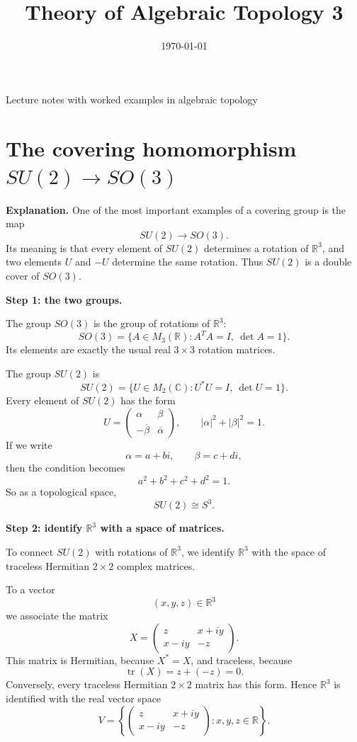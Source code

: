 \documentclass[12pt,a4paper]{article}
\title{\vspace{-1.5em}\bfseries Theory of Algebraic Topology 3}
\author{}
\date{\today}
\theoremstyle{notespace}
\begin{document}
	\maketitle
	\thispagestyle{plain}
		\begin{center}
		\begin{minipage}{0.92\textwidth}
			Lecture notes with worked examples in algebraic topology
		\end{minipage}
	\end{center}
		\tableofcontents
	\clearpage
	
	
\section{The covering homomorphism \(SU(2)\to SO(3)\)}

\textbf{Explanation.}
One of the most important examples of a covering group is the map
\[
SU(2)\to SO(3).
\]
Its meaning is that every element of \(SU(2)\) determines a rotation of \(\mathbb R^3\), and two elements \(U\) and \(-U\) determine the same rotation. Thus \(SU(2)\) is a double cover of \(SO(3)\).

\medskip

\textbf{Step 1: the two groups.}

The group \(SO(3)\) is the group of rotations of \(\mathbb R^3\):
\[
SO(3)=\{A\in M_3(\mathbb R):A^TA=I,\ \det A=1\}.
\]
Its elements are exactly the usual real \(3\times 3\) rotation matrices.

The group \(SU(2)\) is
\[
SU(2)=\{U\in M_2(\mathbb C):U^*U=I,\ \det U=1\}.
\]
Every element of \(SU(2)\) has the form
\[
U=
\begin{pmatrix}
	\alpha & \beta\\
	-\overline{\beta} & \overline{\alpha}
\end{pmatrix},
\qquad
|\alpha|^2+|\beta|^2=1.
\]
If we write
\[
\alpha=a+bi,
\qquad
\beta=c+di,
\]
then the condition becomes
\[
a^2+b^2+c^2+d^2=1.
\]
So as a topological space,
\[
SU(2)\cong S^3.
\]

\medskip

\textbf{Step 2: identify \(\mathbb R^3\) with a space of matrices.}

To connect \(SU(2)\) with rotations of \(\mathbb R^3\), we identify \(\mathbb R^3\) with the space of traceless Hermitian \(2\times 2\) complex matrices.

To a vector
\[
(x,y,z)\in \mathbb R^3
\]
we associate the matrix
\[
X=
\begin{pmatrix}
	z & x+iy\\
	x-iy & -z
\end{pmatrix}.
\]
This matrix is Hermitian, because \(X^*=X\), and traceless, because
\[
\operatorname{tr}(X)=z+(-z)=0.
\]
Conversely, every traceless Hermitian \(2\times 2\) matrix has this form. Hence \(\mathbb R^3\) is identified with the real vector space
\[
V=\left\{
\begin{pmatrix}
	z & x+iy\\
	x-iy & -z
\end{pmatrix}
:x,y,z\in\mathbb R
\right\}.
\]
\end{document}
